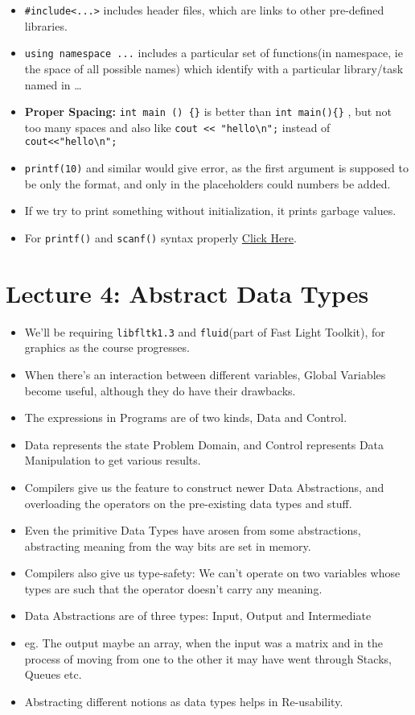 \documentclass{article}
\begin{document}
\begin{itemize}
    \item \verb|#include<...>| includes header files, which are links to other pre-defined libraries.
    \item \verb|using namespace ...| includes a particular set of functions(in namespace, ie the space of all possible names) which identify with a particular library/task named in \ldots
    \item \textbf{Proper Spacing: } \verb|int main () {}| is better than \verb|int main(){}| , but not too many spaces and also like \verb|cout << "hello\n";| instead of \verb|cout<<"hello\n";|
    \item \verb|printf(10)| and similar would give error, as the first argument is supposed to be only the format, and only in the placeholders could numbers be added.
    \item If we try to print something without initialization, it prints garbage values.
    \item For \verb|printf()| and \verb|scanf()| syntax properly \href{http://www.cplusplus.com/reference/cstdio/}{Click Here}.

\end{itemize}

\section{Lecture 4: Abstract Data Types}
\begin{itemize}
  \item  We'll be requiring \verb|libfltk1.3| and \verb|fluid|(part of Fast Light Toolkit), for graphics as the course progresses.
  \item When there's an interaction between different variables, Global Variables become useful, although they do have their drawbacks.
  \item The expressions in Programs are of two kinds, Data and Control.
  \item Data represents the state Problem Domain, and Control represents Data Manipulation to get various results.
  \item Compilers give us the feature to construct newer Data Abstractions, and overloading the operators on the pre-existing data types and stuff.
  \item Even the primitive Data Types have arosen from some abstractions, abstracting meaning from the way bits are set in memory.
  \item Compilers also give us type-safety: We can't operate on two variables whose types are such that the operator doesn't carry any meaning.
  \item Data Abstractions are of three types: Input, Output and Intermediate
  \item eg. The output maybe an array, when the input was a matrix and in the process of moving from one to the other it may have went through Stacks, Queues etc.
  \item Abstracting different notions as data types helps in Re-usability.
\end{itemize}
\end{document}
